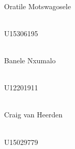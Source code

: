 \begin{titlepage}
\begin{center}
		\begin{minipage}{0.4\textwidth}
			\begin{flushleft} \large
				\emph{} \\
				Oratile {Motswagosele}
			\end{flushleft}
		\end{minipage}
		\begin{minipage}{0.4\textwidth}
			\begin{flushright} \large
				\emph{} \\
				U15306195
			\end{flushright}
		\end{minipage}
		
		\begin{minipage}{0.4\textwidth}
			\begin{flushleft} \large
				\emph{} \\
				Banele {Nxumalo}
			\end{flushleft}
		\end{minipage}
		\begin{minipage}{0.4\textwidth}
			\begin{flushright} \large
				\emph{} \\
				U12201911
			\end{flushright}
		\end{minipage}
		
		\begin{minipage}{0.4\textwidth}
			\begin{flushleft} \large
				\emph{} \\
				Craig {van Heerden}
			\end{flushleft}
		\end{minipage}
		\begin{minipage}{0.4\textwidth}
			\begin{flushright} \large
				\emph{} \\
				U15029779
			\end{flushright}
		\end{minipage}
		
	\end{center}
\end{titlepage}